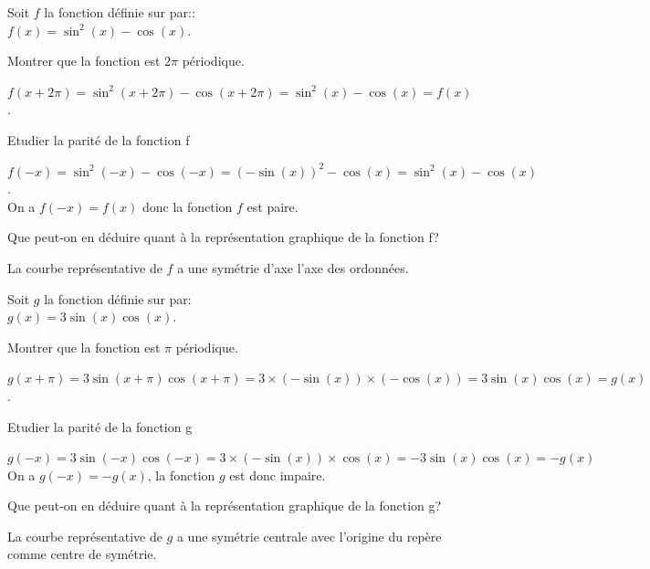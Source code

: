 \documentclass[12pt,a4paper]{article}  %
\begin{document}
%
\vspace{-.3cm} 
	Soit $f$ la fonction définie sur \R par::\\
	$f(x)=\sin^2(x)-\cos(x)$.
	\begin{enumMet}
		\item Montrer que la fonction est $2\pi$ périodique.
		\begin{corrBox}
			$f(x+2\pi)=\sin^2(x+2\pi)-\cos(x+2\pi)=\sin^2(x)-\cos(x)=f(x)$.
		\end{corrBox}
		\item Etudier la parité de la fonction f
		\begin{corrBox}
			$f(-x)=\sin^2(-x)-\cos (-x)=(-\sin(x))^2-\cos(x)=\sin^2(x)-\cos(x)$.\\
			On a $f(-x)=f(x)$ donc la fonction $f$ est paire.	
		\end{corrBox}
		\item Que peut-on en déduire quant à la représentation graphique de la fonction f?
		\begin{corrBox}
			La courbe représentative de $f$ a une symétrie d'axe l'axe des ordonnées.	
		\end{corrBox}
	\end{enumMet}
	\exerciceDS{ \ding{46} - ( 3 points )}
	Soit $g$ la fonction définie sur \R par:\\
	$g(x)=3\sin(x)\cos(x)$.
	\begin{enumMet}
		\item {} Montrer que la fonction est $\pi$ périodique.
		\begin{corrBox}
			$g(x+\pi)=3\sin(x+\pi)\cos(x+\pi)=3\times (-\sin(x))\times (-\cos(x))=3\sin(x)\cos(x)=g(x)$.
		\end{corrBox}
		\item {} Etudier la parité de la fonction g
		\begin{corrBox}
			$g(-x)=3\sin(-x)\cos(-x)=3\times (-\sin(x))\times \cos(x)=-3\sin(x)\cos(x)=-g(x)$\\
			On a $g(-x)=-g(x)$, la fonction $g$ est donc impaire.
		\end{corrBox}
		\item {} Que peut-on en déduire quant à la représentation graphique de la fonction g?
		\begin{corrBox}
			La courbe représentative de $g$ a une symétrie centrale avec l'origine du repère comme centre de symétrie.	
		\end{corrBox}
	\end{enumMet}
\end{document}
